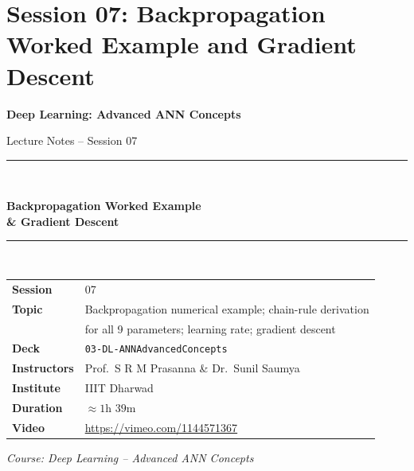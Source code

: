 \documentclass[12pt,a4paper]{article}
\begin{document}
\part{Session 07: Backpropagation Worked Example and Gradient Descent}

\begin{titlepage}
  \centering
  \vspace*{2cm}
  {\LARGE\bfseries Deep Learning: Advanced ANN Concepts\par}
  \vspace{0.5cm}
  {\large Lecture Notes -- Session 07\par}
  \vspace{1.5cm}
  \rule{\linewidth}{0.5pt}\\[0.4cm]
  {\huge\bfseries Backpropagation Worked Example\\[0.3cm]
   \& Gradient Descent\par}
  \rule{\linewidth}{0.5pt}\\[1.5cm]

  \begin{tabular}{ll}
    \textbf{Session}     & 07 \\[4pt]
    \textbf{Topic}       & Backpropagation numerical example; chain-rule derivation \\
                         & for all 9 parameters; learning rate; gradient descent \\[4pt]
    \textbf{Deck}        & \texttt{03-DL-ANNAdvancedConcepts} \\[4pt]
    \textbf{Instructors} & Prof.\ S R M Prasanna \& Dr.\ Sunil Saumya \\[4pt]
    \textbf{Institute}   & IIIT Dharwad \\[4pt]
    \textbf{Duration}    & $\approx 1$h $39$m \\[4pt]
    \textbf{Video}       & \url{https://vimeo.com/1144571367} \\
  \end{tabular}

  \vfill
  {\large\itshape Course: Deep Learning -- Advanced ANN Concepts\par}
\end{titlepage}


\newpage

\end{document}
